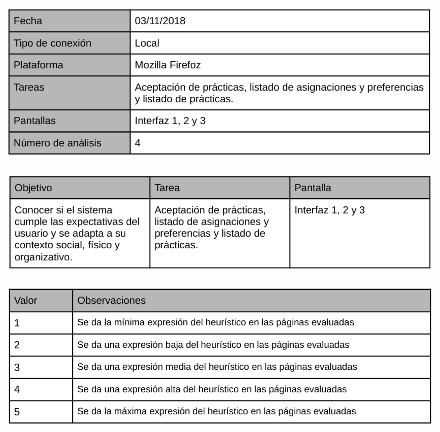 \documentclass[pdftex,11pt,a4paper]{book}
\begin{document}
\begin{figure}[h]
\begin{center}
\includegraphics[width=\textwidth]{img/heuristico1}
\caption{\label{heuristico1}}
\end{center}
\end{figure}

\begin{figure}[h]
\begin{center}
\includegraphics[width=\textwidth]{img/heuristico2}
\caption{\label{heuristico2}}
\end{center}
\end{figure}

\begin{figure}[h]
\begin{center}
\includegraphics[width=\textwidth]{img/heuristico3}
\caption{\label{heuristico3}}
\end{center}
\end{figure}
\end{document}
